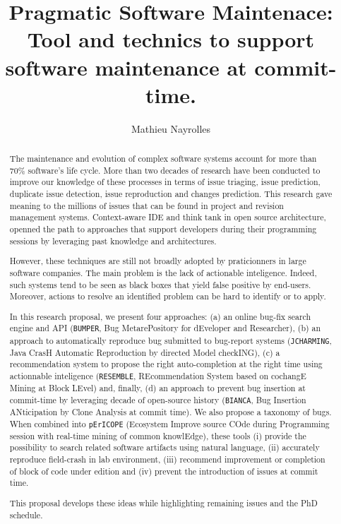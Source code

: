 \documentclass[11pt,a4paper, cuthesis]{report}
\author{Mathieu Nayrolles}
\title{Pragmatic Software Maintenace: \\ Tool and technics to support software maintenance at commit-time.}
\begin{document}
\begin{abstract}

  The maintenance and evolution of complex software systems account for more than 70\% software's life cycle.
  More than two decades of research have been conducted to improve our knowledge of these processes in terms of issue triaging, issue prediction, duplicate issue detection, issue reproduction and changes prediction.
  This research gave meaning to the millions of issues that can be found in project and revision management systems.
  Context-aware IDE and think tank in open source architecture, openned the path to approaches that support developers during their programming sessions by leveraging past knowledge and architectures.

  However, these techniques are still not broadly adopted by praticionners in large software companies.
  The main problem is the lack of actionable inteligence.
  Indeed, such systems tend to be seen as black boxes that yield false positive by end-users.
  Moreover, actions to resolve an identified problem can be hard to identify or to apply.

  In this research proposal, we present four approaches: (a) an online bug-fix search engine and API ({\tt BUMPER}, Bug MetarePository for dEveloper and Researcher), (b) an approach to automatically reproduce bug submitted to bug-report systems ({\tt JCHARMING}, Java CrasH Automatic Reproduction by directed Model checkING), (c) a recommendation system to propose the right auto-completion at the right time using actionnable inteligence ({\tt RESEMBLE}, REcommendation System based on cochangE Mining at Block LEvel) and, finally, (d) an approach to prevent bug insertion at commit-time by leveraging decade of open-source history ({\tt BIANCA}, Bug Insertion ANticipation by Clone Analysis at commit time).
  We also propose a taxonomy of bugs.
  When combined into {\tt pErICOPE} (Ecosystem Improve source COde during Programming session with real-time mining of common knowlEdge), these tools (i) provide the possibility to search related software artifacts using natural language, (ii) accurately reproduce field-crash in lab environment, (iii) recommend improvement or completion of block of code under edition and (iv) prevent the introduction of issues at commit time.

  This proposal develops these ideas while highlighting remaining issues and the PhD schedule.
\end{abstract}

\tableofcontents
\listoffigures
\listoftables
\end{document}
